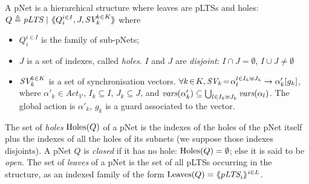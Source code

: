 \documentclass{llncs}
\newcommand{\cV}{\ensuremath{\mathcal{V}}}
\newcommand{\variables}{\ensuremath{\cV}}
\newcommand{\actions}[1]{\ensuremath{\mathit{Act}_{#1}}}
\begin{document}
\begin{definition}[pNets]\label{defn:pnets}
A pNet is a hierarchical structure where leaves are pLTSs and holes: %
$Q\triangleq \pLTS~|~\mylangle Q_i^{i\in I}, J, \symb{SV}_k^{k\in 
K}\myrangle$
where\\[-3.5ex]
\begin{itemize}
\item $Q_i^{i\in I}$ is the family of sub-pNets;

\item $J$ is a set of indexes, called \emph{holes}.
$I$ and $J$ are \emph{disjoint}: $I\!\cap\! J=\emptyset$,  $I\!\cup\! J\neq\emptyset$

\item $\symb{SV}_k^{k\in K}$ is a set of
  synchronisation vectors. %
$\forall k\!\in\! K,
  \symb{SV}_k\!=\SV{\!\alpha_{l}^{l\in I_k \uplus J_k}}{\alpha'_k}{g_k}$, where
  $\alpha'_k\in \actions{\variables}$, $I_k\subseteq I$, $J_k\subseteq J$, and 
  $\vars(\alpha'_k)\subseteq \bigcup_{l\in I_k\uplus 
  J_k}{\vars({\alpha_l})}$. The global action  is
$\alpha'_k$,  $g_k$ is a guard associated to the vector.


\end{itemize}
The set of \emph{holes} $\operatorname{Holes}(Q)$ of a pNet is the indexes of the holes of the pNet 
itself plus the indexes of all the holes of its subnets (we suppose those indexes 
disjoints). A pNet $Q$ is \emph{closed} if it has no hole: $\operatorname{Holes}(Q)=\emptyset$; else it
is said to be \emph{open}.
%
The set of \emph{leaves} of a pNet is the set of all pLTSs occurring in the structure, as an 
indexed family of the form $\Leaves(Q)= \mylangle \pLTS_i \myrangle^{i \in L}$.

\end{definition}
\end{document}
